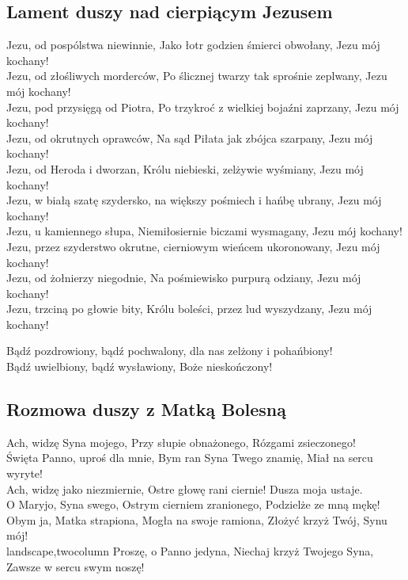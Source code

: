 \subsection{Lament duszy nad cierpiącym Jezusem}

Jezu, od pospólstwa niewinnie, Jako łotr godzien śmierci obwołany, Jezu
mój kochany!\\
Jezu, od złośliwych morderców, Po ślicznej twarzy tak sprośnie zeplwany,
Jezu mój kochany!\\
Jezu, pod przysięgą od Piotra, Po trzykroć z wielkiej bojaźni zaprzany,
Jezu mój kochany!\\
Jezu, od okrutnych oprawców, Na sąd Piłata jak zbójca szarpany, Jezu mój
kochany!\\
Jezu, od Heroda i dworzan, Królu niebieski, zelżywie wyśmiany, Jezu mój
kochany!\\
Jezu, w białą szatę szydersko, na większy pośmiech i hańbę ubrany, Jezu
mój kochany!\\
Jezu, u kamiennego słupa, Niemiłosiernie biczami wysmagany, Jezu mój
kochany!\\
Jezu, przez szyderstwo okrutne, cierniowym wieńcem ukoronowany, Jezu mój
kochany!\\
Jezu, od żołnierzy niegodnie, Na pośmiewisko purpurą odziany, Jezu mój
kochany!\\
Jezu, trzciną po głowie bity, Królu boleści, przez lud wyszydzany, Jezu
mój kochany!

Bądź pozdrowiony, bądź pochwalony, dla nas zelżony i pohańbiony!\\
Bądź uwielbiony, bądź wysławiony, Boże nieskończony!


\subsection{Rozmowa duszy z Matką Bolesną}

Ach, widzę Syna mojego, Przy słupie obnażonego, Rózgami zsieczonego!\\
Święta Panno, uproś dla mnie, Bym ran Syna Twego znamię, Miał na sercu
wyryte!\\
Ach, widzę jako niezmiernie, Ostre głowę rani ciernie! Dusza moja
ustaje.\\
O Maryjo, Syna swego, Ostrym cierniem zranionego, Podzielże ze mną
mękę!\\
Obym ja, Matka strapiona, Mogła na swoje ramiona, Złożyć krzyż Twój,
Synu mój!\\landscape,twocolumn
Proszę, o Panno jedyna, Niechaj krzyż Twojego Syna, Zawsze w sercu swym
noszę!

